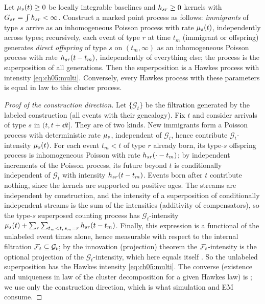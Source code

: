 \begin{theorem}\label{thm:ch05:cluster}
Let $\mu_s(t) \ge 0$ be locally integrable baselines and $h_{sr}
\ge 0$ kernels with $G_{sr} = \int h_{sr} < \infty$. Construct a
marked point process as follows: \emph{immigrants} of type $s$ arrive as
an inhomogeneous Poisson process with rate $\mu_s(t)$, independently
across types; recursively, each event of type $r$ at time $t_m$ (immigrant
or offspring) generates \emph{direct offspring} of type $s$ on
$(t_m,\infty)$ as an inhomogeneous Poisson process with rate
$h_{sr}(t - t_m)$, independently of everything else; the process is
the superposition of all generations. Then the superposition is a Hawkes
process with intensity \cref{eq:ch05:multi}. Conversely, every Hawkes
process with these parameters is equal in law to this cluster process.
\end{theorem}

\begin{proof}[Proof of the construction direction]
Let $\{\mathcal{G}_t\}$ be the filtration generated by the labeled
construction (all events with their genealogy). Fix $t$ and consider
arrivals of type $s$ in $(t, t+\dd t]$. They are of two kinds. New
immigrants form a Poisson process with deterministic rate $\mu_s$,
independent of $\mathcal{G}_t$, hence contribute $\mathcal{G}_t$-intensity
$\mu_s(t)$. For each event $t_m < t$ of type $r$ already born, its
type-$s$ offspring process is inhomogeneous Poisson with rate
$h_{sr}(\cdot - t_m)$; by independent increments of the Poisson
process, its future beyond $t$ is conditionally independent of
$\mathcal{G}_t$ with intensity $h_{sr}(t - t_m)$. Events born after
$t$ contribute nothing, since the kernels are supported on positive ages.
The streams are independent by construction, and the intensity of a
superposition of conditionally independent streams is the sum of the
intensities (additivity of compensators), so the type-$s$ superposed
counting process has $\mathcal{G}_t$-intensity $\mu_s(t) + \sum_r
\sum_{t_m<t,\,s_m=r} h_{sr}(t - t_m)$. Finally, this expression is a
functional of the unlabeled event times alone, hence measurable with
respect to the internal filtration $\mathcal{F}_{t} \subseteq \mathcal{G}_t$; by the
innovation (projection) theorem the $\mathcal{F}_{t}$-intensity is the optional
projection of the $\mathcal{G}_t$-intensity, which here equals itself
\citep[Ch.~7]{daley2003}. So the unlabeled superposition has the Hawkes
intensity \cref{eq:ch05:multi}. The converse (existence and uniqueness in
law of the cluster decomposition for a given Hawkes law) is
\citet{hawkesoakes1974}; we use only the construction direction, which is
what simulation and EM consume.
\end{proof}

